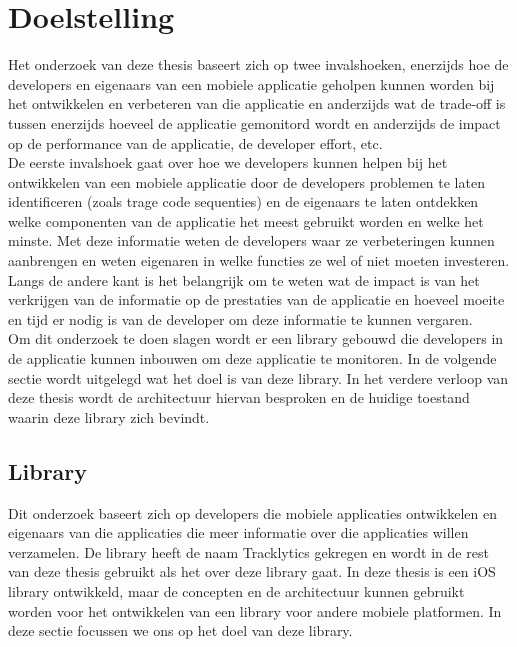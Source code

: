 \chapter{Doelstelling}
Het onderzoek van deze thesis baseert zich op twee invalshoeken, enerzijds hoe de developers en eigenaars van een mobiele applicatie geholpen kunnen worden bij het ontwikkelen en verbeteren van die applicatie en anderzijds wat de trade-off is tussen enerzijds hoeveel de applicatie gemonitord wordt en anderzijds de impact op de performance van de applicatie, de developer effort, etc. \\

De eerste invalshoek gaat over hoe we developers kunnen helpen bij het ontwikkelen van een mobiele applicatie door de developers problemen te laten identificeren (zoals trage code sequenties) en de eigenaars te laten ontdekken welke componenten van de applicatie het meest gebruikt worden en welke het minste. Met deze informatie weten de developers waar ze verbeteringen kunnen aanbrengen en weten eigenaren in welke functies ze wel of niet moeten investeren. \\

Langs de andere kant is het belangrijk om te weten wat de impact is van het verkrijgen van de informatie op de prestaties van de applicatie en hoeveel moeite en tijd er nodig is van de developer om deze informatie te kunnen vergaren.\\


Om dit onderzoek te doen slagen wordt er een library gebouwd die developers in de applicatie kunnen inbouwen om deze applicatie te monitoren. In de volgende sectie wordt uitgelegd wat het doel is van deze library. In het verdere verloop van deze thesis wordt de architectuur hiervan besproken en de huidige toestand waarin deze library zich bevindt. 

\section{Library}
Dit onderzoek baseert zich op developers die mobiele applicaties ontwikkelen en eigenaars van die applicaties die meer informatie over die applicaties willen verzamelen. De library heeft de naam Tracklytics gekregen en wordt in de rest van deze thesis gebruikt als het over deze library gaat. In deze thesis is een iOS library ontwikkeld, maar de concepten en de architectuur kunnen gebruikt worden voor het ontwikkelen van een library voor andere mobiele platformen. In deze sectie focussen we ons op het doel van deze library. \\

